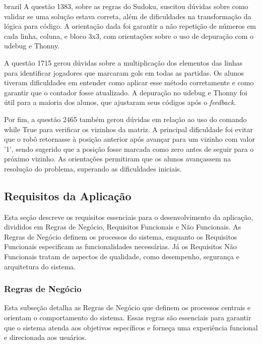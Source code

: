 \begin{otherlanguage*}{brazil}
A questão 1383, sobre as regras do Sudoku, suscitou dúvidas sobre como validar se uma solução estava correta, além de dificuldades na transformação da lógica para código. A orientação dada foi garantir a não repetição de números em cada linha, coluna, e bloco 3x3, com orientações sobre o uso de depuração com o udebug e Thonny.

A questão 1715 gerou dúvidas sobre a multiplicação dos elementos das linhas para identificar jogadores que marcaram gols em todas as partidas. Os alunos tiveram dificuldades em entender como aplicar esse método corretamente e como garantir que o contador fosse atualizado. A depuração no udebug e Thonny foi útil para a maioria dos alunos, que ajustaram seus códigos após o \textit{feedback}.

Por fim, a questão 2465 também gerou dúvidas em relação ao uso do comando while True para verificar os vizinhos da matriz. A principal dificuldade foi evitar que o robô retornasse à posição anterior após avançar para um vizinho com valor '1', sendo sugerido que a posição fosse marcada como zero antes de seguir para o próximo vizinho. As orientações permitiram que os alunos avançassem na resolução do problema, superando as dificuldades iniciais.

\subsection{Requisitos da Aplicação}
\label{sec:requisitos-aplicacao}

Esta seção descreve os requisitos essenciais para o desenvolvimento da aplicação, divididos em Regras de Negócio, Requisitos Funcionais e Não Funcionais. As Regras de Negócio definem os processos do sistema, enquanto os Requisitos Funcionais especificam as funcionalidades necessárias. Já os Requisitos Não Funcionais tratam de aspectos de qualidade, como desempenho, segurança e arquitetura do sistema.

\subsubsection{Regras de Negócio}

Esta subseção detalha as Regras de Negócio que definem os processos centrais e orientam o comportamento do sistema. Essas regras são essenciais para garantir que o sistema atenda aos objetivos específicos e forneça uma experiência funcional e direcionada aos usuários.


\end{otherlanguage*}
